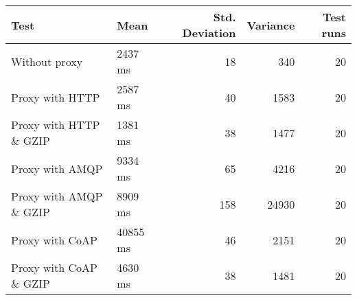 \begin{tabular}{llrrr}
\hline
 Test                   & Mean     &   Std. Deviation &   Variance &   Test runs \\
\hline
 Without proxy          & 2437 ms  &               18 &        340 &          20 \\
 Proxy with HTTP        & 2587 ms  &               40 &       1583 &          20 \\
 Proxy with HTTP \& GZIP & 1381 ms  &               38 &       1477 &          20 \\
 Proxy with AMQP        & 9334 ms  &               65 &       4216 &          20 \\
 Proxy with AMQP \& GZIP & 8909 ms  &              158 &      24930 &          20 \\
 Proxy with CoAP        & 40855 ms &               46 &       2151 &          20 \\
 Proxy with CoAP \& GZIP & 4630 ms  &               38 &       1481 &          20 \\
\hline
\end{tabular}
